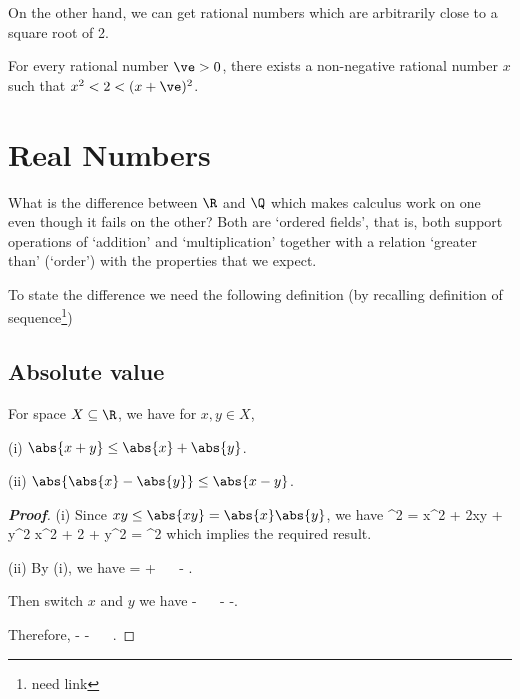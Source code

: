On the other hand, we can get rational numbers which are arbitrarily close to a square root of 2.

\begin{proposition}
For every rational number $\ve>0$, there exists a non-negative rational number $x$ such that $x^2 <2<(x+\ve)^2$.
\end{proposition}

\section{Real Numbers}

What is the difference between $\R$ and $\Q$ which makes calculus work on one even though it fails on the other? Both are `ordered fields', that is, both support operations of `addition' and `multiplication' together with a relation `greater than' (`order') with the properties that we expect.

To state the difference we need the following definition (by recalling definition of sequence\footnote{need link})


\subsection{Absolute value}

\begin{proposition}\label{pro:real_number_inequality_absolute_value}
For space $X\subseteq \R$, we have for $x,y\in X$,
\ben
\item [(i)] $\abs{x+y} \leq \abs{x} + \abs{y}$.
\item [(ii)] $\abs{\abs{x}-\abs{y}} \leq \abs{x-y}$.
\een
\end{proposition}

\begin{proof}[\bf Proof]
\ben
\item [(i)] Since $xy\leq \abs{xy} = \abs{x}\abs{y}$, we have
\be
{}^2 = x^2 + 2xy + y^2 \leq x^2 + 2 + y^2 = ^2
\ee
which implies the required result.

\item [(ii)] By (i), we have
\be
{} =  \leq {} +  \ \ra\  - \leq {}.
\ee

Then switch $x$ and $y$ we have
\be
{} -  \leq {} \ \ra\  - \geq -.
\ee

Therefore,
\be
- \leq {} - \leq {} \ \ra\  \leq {}.
\ee
\een
\end{proof}

